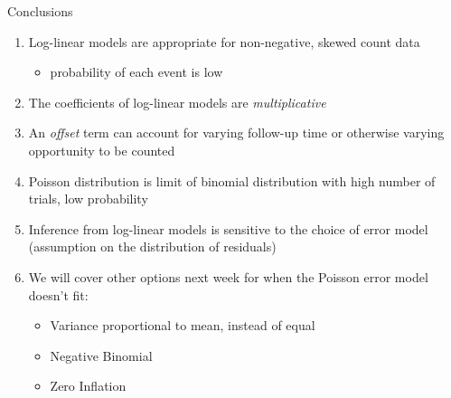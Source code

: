 \documentclass[ignorenonframetext,]{beamer}
\providecommand{\tightlist}{%
  \setlength{\itemsep}{0pt}\setlength{\parskip}{0pt}}
\begin{document}
\begin{frame}{Conclusions}
\protect\hypertarget{conclusions-1}{}

\begin{enumerate}
\tightlist
\item
  Log-linear models are appropriate for non-negative, skewed count data

  \begin{itemize}
  \tightlist
  \item
    probability of each event is low
  \end{itemize}
\item
  The coefficients of log-linear models are \emph{multiplicative}
\item
  An \emph{offset} term can account for varying follow-up time or
  otherwise varying opportunity to be counted
\item
  Poisson distribution is limit of binomial distribution with high
  number of trials, low probability
\item
  Inference from log-linear models is sensitive to the choice of error
  model (assumption on the distribution of residuals)
\item
  We will cover other options next week for when the Poisson error model
  doesn't fit:

  \begin{itemize}
  \tightlist
  \item
    Variance proportional to mean, instead of equal
  \item
    Negative Binomial
  \item
    Zero Inflation
  \end{itemize}
\end{enumerate}

\end{frame}
\end{document}
